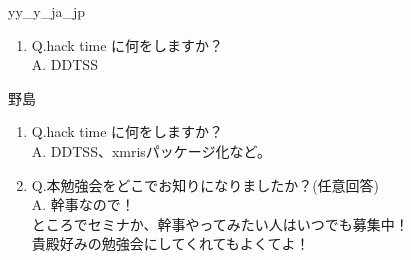 \begin{prework}{ yy\_y\_ja\_jp }
  \begin{enumerate}
  \item Q.hack time に何をしますか？\\
    A. DDTSS
  \end{enumerate}
\end{prework}

\begin{prework}{ 野島 }
  \begin{enumerate}
  \item Q.hack time に何をしますか？\\
    A. DDTSS、xmrisパッケージ化など。
  \item Q.本勉強会をどこでお知りになりましたか？(任意回答)\\
    A. 幹事なので！\\ところでセミナか、幹事やってみたい人はいつでも募集中！\\貴殿好みの勉強会にしてくれてもよくてよ！
  \end{enumerate}
\end{prework}

